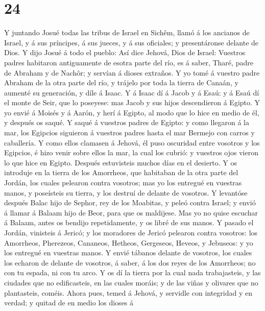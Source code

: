 \hypertarget{section-23}{%
\section{24}\label{section-23}}

 Y juntando Josué todas las tribus de Israel en Sichêm,
llamó á los ancianos de Israel, y á sus príncipes, á sus jueces, y á sus
oficiales; y presentáronse delante de Dios.  Y dijo Josué á
todo el pueblo: Así dice Jehová, Dios de Israel: Vuestros padres
habitaron antiguamente de esotra parte del río, es á saber, Tharé, padre
de Abraham y de Nachôr; y servían á dioses extraños.  Y yo
tomé á vuestro padre Abraham de la otra parte del río, y trájelo por
toda la tierra de Canaán, y aumenté su generación, y díle á Isaac.
 Y á Isaac dí á Jacob y á Esaú: y á Esaú dí el monte de
Seir, que lo poseyese: mas Jacob y sus hijos descendieron á Egipto.
 Y yo envié á Moisés y á Aarón, y herí á Egipto, al modo que
lo hice en medio de él, y después os saqué.  Y saqué á
vuestros padres de Egipto: y como llegaron á la mar, los Egipcios
siguieron á vuestros padres hasta el mar Bermejo con carros y
caballería.  Y como ellos clamasen á Jehová, él puso
oscuridad entre vosotros y los Egipcios, é hizo venir sobre ellos la
mar, la cual los cubrió: y vuestros ojos vieron lo que hice en Egipto.
Después estuvisteis muchos días en el desierto.  Y os
introduje en la tierra de los Amorrheos, que habitaban de la otra parte
del Jordán, los cuales pelearon contra vosotros; mas yo los entregué en
vuestras manos, y poseísteis su tierra, y los destruí de delante de
vosotros.  Y levantóse después Balac hijo de Sephor, rey de
los Moabitas, y peleó contra Israel; y envió á llamar á Balaam hijo de
Beor, para que os maldijese.  Mas yo no quise escuchar á
Balaam, antes os bendijo repetidamente, y os libré de sus manos.
 Y pasado el Jordán, vinisteis á Jericó; y los moradores de
Jericó pelearon contra vosotros: los Amorrheos, Pherezeos, Cananeos,
Hetheos, Gergeseos, Heveos, y Jebuseos: y yo los entregué en vuestras
manos.  Y envié tábanos delante de vosotros, los cuales los
echaron de delante de vosotros, á saber, á los dos reyes de los
Amorrheos; no con tu espada, ni con tu arco.  Y os dí la
tierra por la cual nada trabajasteis, y las ciudades que no
edificasteis, en las cuales moráis; y de las viñas y olivares que no
plantasteis, coméis.  Ahora pues, temed á Jehová, y
servidle con integridad y en verdad; y quitad de en medio los dioses á
